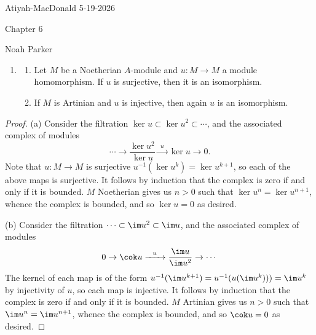 \documentclass[12pt]{amsart}
\begin{document}
{Atiyah-MacDonald} \hfill {5-19-2026}

\bigskip\bigskip

\begin{center}

{\sc Chapter 6}

\end{center}

\begin{center}

  {Noah Parker} 
    
\end{center}

\bigskip

\begin{enumerate}
	\item[6.1.] {
      \begin{enumerate}
        \item Let $M$ be a Noetherian $A$-module and $u:M\to M$ a module homomorphism.
          If $u$ is surjective, then it is an isomorphism.
        \item If $M$ is Artinian and $u$ is injective, then again $u$ is an isomorphism.
      \end{enumerate}
    }
\end{enumerate}

\begin{proof}
  (a) Consider the filtration $\ker u\subset \ker u^2\subset\cdots$, and the associated complex of modules
  \[
    \cdots \to \frac{\ker u^2}{\ker u} \xrightarrow{~~u~~} \ker u \to 0.
  \] 
  Note that $u:M\to M$ is surjective $u^{-1}(\ker u^k)= \ker u^{k+1}$, so each of the above maps is surjective.
  It follows by induction that the complex is zero if and only if it is bounded.
  $M$ Noetherian gives us $n>0$ such that $\ker u^n = \ker u^{n+1}$, whence the complex is bounded, and so $\ker u=0$ as desired.

  (b) Consider the filtration $\cdots \subset \im u^2\subset \im u$, and the associated complex of modules
  \[
    0\to \cok u \xrightarrow{~~u~~} \frac{\im u}{\im u^2} \to \cdots
  \] 
  The kernel of each map is of the form $u^{-1}(\im u^{k+1})= u^{-1}(u(\im u^k)))=\im u^k$ by injectivity of $u$, so each map is injective.
  It follows by induction that the complex is zero if and only if it is bounded.
  $M$ Artinian gives us $n> 0$ such that $\im u^n = \im u^{n+1}$, whence the complex is bounded, and so $\cok u=0$ as desired.
\end{proof}
\end{document}
